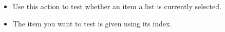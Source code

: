 \begin{itemize}
\item Use this action to test whether an item a list is currently selected. 
\item The item you want to test is given using its index. 
\end{itemize}
